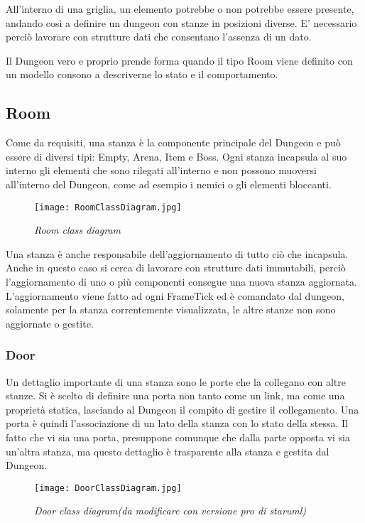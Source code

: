 All'interno di una griglia, un elemento potrebbe o non potrebbe essere presente, andando così a definire un dungeon con stanze in posizioni diverse. 
E' necessario perciò lavorare con strutture dati che consentano l'assenza di un dato.

Il Dungeon vero e proprio prende forma quando il tipo Room viene definito con un modello consono a descriverne lo stato e il comportamento. 

\subsection{Room}
Come da requisiti, una stanza è la componente principale del Dungeon e può essere di diversi tipi: Empty, Arena, Item e Boss. 
Ogni stanza incapsula al suo interno gli elementi che sono rilegati all'interno e non possono muoversi all'interno del Dungeon, come ad esempio i nemici o gli elementi bloccanti. 

\begin{figure}[!hbt]
    \centering
    \texttt{[image: RoomClassDiagram.jpg]}
    \caption{\textit{Room class diagram}} 
\end{figure}

Una stanza è anche responsabile dell'aggiornamento di tutto ciò che incapsula. Anche in questo caso si cerca di lavorare con strutture dati immutabili, perciò l'aggiornamento di uno o più componenti consegue una nuova stanza aggiornata. 
L'aggiornamento viene fatto ad ogni FrameTick ed è comandato dal dungeon, solamente per la stanza correntemente visualizzata, le altre stanze non sono aggiornate o gestite.  

\subsubsection{Door}
Un dettaglio importante di una stanza sono le porte che la collegano con altre stanze. Si è scelto di definire una porta non tanto come un link, ma come una proprietà statica, lasciando al Dungeon il compito di gestire il collegamento. 
Una porta è quindi l'associazione di un lato della stanza con lo stato della stessa. Il fatto che vi sia una porta, presuppone comunque che dalla parte opposta vi sia un'altra stanza, ma questo dettaglio è trasparente alla stanza e gestita dal Dungeon. 
\begin{figure}[!hbt]
    \centering
    \texttt{[image: DoorClassDiagram.jpg]}
    \caption{\textit{Door class diagram(da modificare con versione pro di staruml)}} 
\end{figure}

